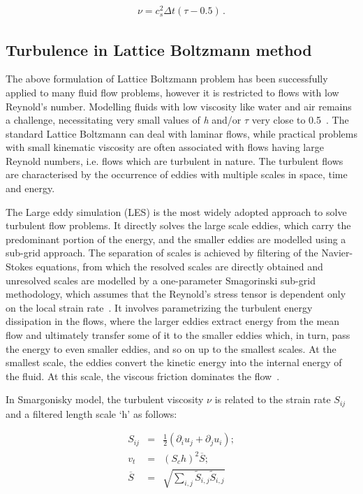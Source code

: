 \begin{align}
\nu=c_s^2\Delta t(\tau-0.5)\,.
\end{align}


\subsection{Turbulence in Lattice Boltzmann method}

The above formulation of Lattice Boltzmann problem has been successfully 
applied to many fluid flow problems, however it is restricted to flows with low 
Reynold's number. Modelling fluids with low viscosity like water and air 
remains a challenge, necessitating very small values of \textit{h} and/or 
$\tau$ very close to 0.5~\citep{He1997}. The standard Lattice Boltzmann can 
deal with laminar flows, while practical problems with small kinematic 
viscosity are often associated with flows having large Reynold numbers, i.e. 
flows which are turbulent in nature. The turbulent flows are characterised by 
the occurrence of eddies with multiple scales in space, time and energy.

The Large eddy simulation (LES) is the most widely adopted approach to solve 
turbulent flow problems. It directly solves the large scale eddies, which carry 
the predominant portion of the energy, and the smaller eddies are modelled 
using a sub-grid approach. The separation of scales is achieved by filtering of 
the Navier-Stokes equations, from which the resolved scales are directly 
obtained and unresolved scales are modelled by a one-parameter Smagorinski 
sub-grid methodology, which assumes that the Reynold's stress tensor is 
dependent only on the local strain rate~\citep{Smagorinsky1963}. It involves 
parametrizing the turbulent energy dissipation in the flows, where the larger 
eddies extract energy from the mean flow and ultimately transfer some of it to 
the smaller eddies which, in turn, pass the energy to even smaller eddies, and 
so on up to the smallest scales. At the smallest scale, the eddies convert the 
kinetic energy into the internal energy of the fluid. At this scale, the 
viscous friction dominates the flow~\citep{Frisch1995}.

In Smargonisky model, the turbulent viscosity $\nu$ is related to the strain 
rate $S_{ij}$ and a filtered length scale `h' as follows:

\begin{align}
S_{ij} & = &\frac{1}{2}(\partial_i u_j + \partial_j u_i); \\
\mathit{v}_{\mathit{t}} & = & (\mathit{S}_{c}\mathit{h})^{2}\overline{S}; \\
\overline{S} & = & 
\sqrt{\sum\limits_{\mathit{i,j}}{\tilde{S}_{\mathit{i,j}}\tilde{S}_{\mathit{i,j}}}}
\end{align}


